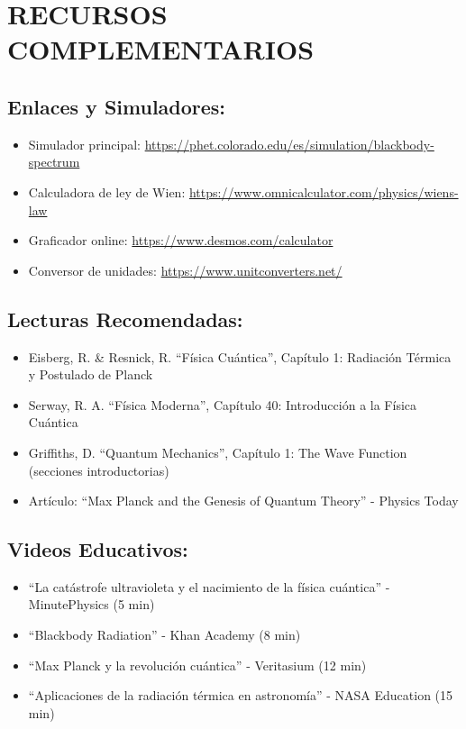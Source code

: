 \documentclass[12pt,a4paper]{article}
\begin{document}
	
	\section{RECURSOS COMPLEMENTARIOS}
	
	\subsection{Enlaces y Simuladores:}
	\begin{itemize}
		\item Simulador principal: \url{https://phet.colorado.edu/es/simulation/blackbody-spectrum}
		\item Calculadora de ley de Wien: \url{https://www.omnicalculator.com/physics/wiens-law}
		\item Graficador online: \url{https://www.desmos.com/calculator}
		\item Conversor de unidades: \url{https://www.unitconverters.net/}
	\end{itemize}
	
	\subsection{Lecturas Recomendadas:}
	\begin{itemize}
		\item Eisberg, R. \& Resnick, R. ``Física Cuántica'', Capítulo 1: Radiación Térmica y Postulado de Planck
		\item Serway, R. A. ``Física Moderna'', Capítulo 40: Introducción a la Física Cuántica
		\item Griffiths, D. ``Quantum Mechanics'', Capítulo 1: The Wave Function (secciones introductorias)
		\item Artículo: ``Max Planck and the Genesis of Quantum Theory'' - Physics Today
	\end{itemize}
	
	\subsection{Videos Educativos:}
	\begin{itemize}
		\item ``La catástrofe ultravioleta y el nacimiento de la física cuántica'' - MinutePhysics (5 min)
		\item ``Blackbody Radiation'' - Khan Academy (8 min)
		\item ``Max Planck y la revolución cuántica'' - Veritasium (12 min)
		\item ``Aplicaciones de la radiación térmica en astronomía'' - NASA Education (15 min)
	\end{itemize}
	
\end{document}
